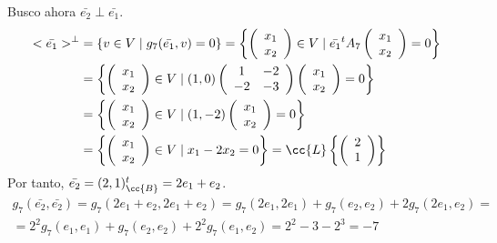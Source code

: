 \begin{ejercicio}
\begin{enumerate}
        Busco ahora $\bar{e_2} \perp \bar{e_1}$.
        \begin{equation*}\begin{split}
            <\bar{e_1}>^\perp &= \{v \in V \mid g_7(\bar{e_1},v) = 0\} 
            = \left\{ \left(\begin{array}{c}
                 x_1 \\ x_2
            \end{array} \right) \in V \mid \bar{e_1}^t A_7
            \left(\begin{array}{c}
                 x_1 \\ x_2
            \end{array} \right) = 0\right\} \\
            &= \left\{ \left(\begin{array}{c}
                 x_1 \\ x_2
            \end{array} \right) \in V \mid (1,0)\left(\begin{array}{cc}
                1 & -2 \\
                -2 & -3
            \end{array} \right) 
            \left(\begin{array}{c}
                 x_1 \\ x_2
            \end{array} \right) = 0\right\} \\
            &= \left\{ \left(\begin{array}{c}
                 x_1 \\ x_2
            \end{array} \right) \in V \mid (1,-2)
            \left(\begin{array}{c}
                 x_1 \\ x_2
            \end{array} \right) = 0\right\} \\
            &= \left\{ \left(\begin{array}{c}
                 x_1 \\ x_2
            \end{array} \right) \in V \mid x_1-2x_2 = 0\right\}
            = \cc{L} \left\{ \left(\begin{array}{c}
                 2 \\ 1
            \end{array} \right) \right\}
        \end{split}\end{equation*}
        Por tanto, $\bar{e_2} = (2,1)^t_\cc{B} = 2e_1+e_2$.
        \begin{multline*}
            g_7(\bar{e_2}, \bar{e_2}) = g_7(2e_1+e_2, 2e_1+e_2) = g_7(2e_1,2e_1) + g_7(e_2,e_2) + 2g_7(2e_1, e_2)
            =\\=
            2^2g_7(e_1, e_1) + g_7(e_2,e_2)+2^2g_7(e_1, e_2) = 2^2 - 3-2^3 = -7
        \end{multline*}


\end{enumerate}
\end{ejercicio}
